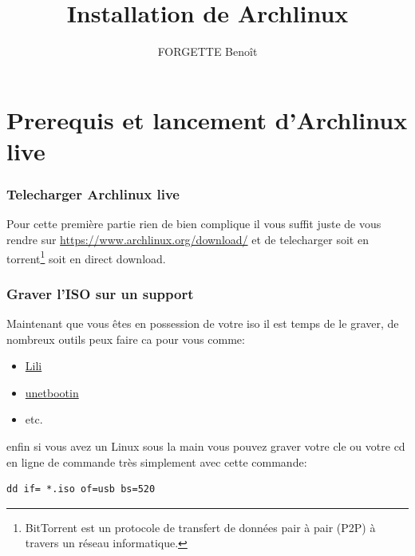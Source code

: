 \documentclass[a4paper]{book}
\begin{document}
\title{Installation de Archlinux}
\author{FORGETTE Benoît}
\maketitle


\tableofcontents
\part{Prerequis et lancement d'Archlinux live}
\section{Telecharger Archlinux live}
Pour cette première partie rien de bien complique il vous suffit juste de
vous rendre sur \url{https://www.archlinux.org/download/} et de telecharger
soit en torrent\footnote{BitTorrent est un protocole de transfert de données 
pair à pair (P2P) à travers un réseau informatique.}
soit en direct download.
\section{Graver l'ISO sur un support}
Maintenant que vous êtes en possession de votre iso il est temps de le
graver, de nombreux outils peux faire ca pour vous comme\@:
\begin{itemize} 
  \item \href{http://www.linuxliveusb.com/fr/download}{Lili}
  \item \href{https://unetbootin.github.io/}{unetbootin}
  \item etc.
\end{itemize}
enfin si vous avez un Linux sous la main vous pouvez graver votre cle ou
votre cd en ligne de commande très simplement avec cette commande\@:\\
\begin{lstlisting}
dd if= *.iso of=usb bs=520
\end{lstlisting}
\end{document}

